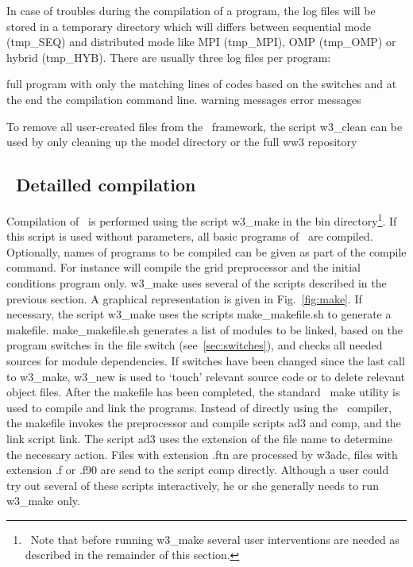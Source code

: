 \vspace{\baselineskip} \noindent
In case of troubles during the compilation of a program, the log files will be
stored in a temporary directory which will differs between sequential mode
({\dir tmp\_SEQ}) and distributed mode like MPI ({\dir tmp\_MPI}), OMP 
({\dir tmp\_OMP}) or hybrid ({\dir tmp\_HYB}). There are usually three log files
per program:

\begin{flist}
 {full program with only the matching lines
	of codes based on the switches and at the end the compilation command line.}
	 {warning messages}
	 {error messages}
\end{flist}

To remove all user-created files from the \ws\ framework, the script 
{\file w3\_clean} can be used by only cleaning up the {\dir model} directory
 or the full ww3 repository 


\vssub
\subsection{~Detailled compilation}
\vssub

Compilation of \ws\ is performed using the script {\file w3\_make} in the
{\dir bin} directory\footnote{~Note that before running {\file w3\_make}
  several user interventions are needed as described in the remainder of this
  section.}.  If this script is used without parameters, all basic programs of
\ws\ are compiled. Optionally, names of programs to be compiled can be given
as part of the compile command. For instance  will compile the grid preprocessor and the initial conditions
program only. {\file w3\_make} uses several of the scripts described in the
previous section. A graphical representation is given in Fig.~\ref{fig:make}.
If necessary, the script {\file w3\_make} uses the scripts {\file
  make\_makefile.sh} to generate a makefile. {\file make\_makefile.sh}
generates a list of modules to be linked, based on the program switches in the
file {\file switch} (see~\para\ref{sec:switches}), and checks all needed
sources for module dependencies. If switches have been changed since the last
call to {\file w3\_make}, {\file w3\_new} is used to `touch' relevant source
code or to delete relevant object files. After the makefile has been
completed, the standard \unix\ make utility is used to compile and link the
programs. Instead of directly using the \fortran\ compiler, the makefile
invokes the preprocessor and compile scripts {\file ad3} and {\file comp}, and
the link script {\file link}. The script {\file ad3} uses the extension of the
file name to determine the necessary action. Files with extension {\file .ftn}
are processed by {\code w3adc}, files with extension {\file .f} or {\file
  .f90} are send to the script {\code comp} directly.  Although a user could
try out several of these scripts interactively, he or she generally needs to
run {\file w3\_make} only.

